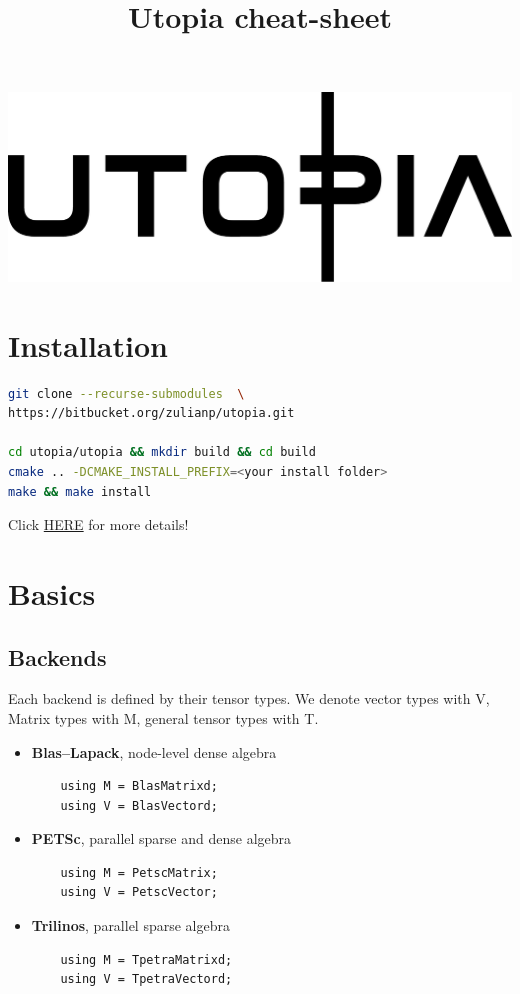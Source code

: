 \documentclass[a4paper,landscape,columns=3]{cheatsheet} %
\title{Utopia cheat-sheet}
\begin{document}
\href{https://bitbucket.org/zulianp/utopia}{\includegraphics[width=0.5\linewidth]{../../utopia_logo.pdf}}
\section{Installation}\footnotesize

\begin{lstlisting}[language=bash]
git clone --recurse-submodules  \
https://bitbucket.org/zulianp/utopia.git

cd utopia/utopia && mkdir build && cd build
cmake .. -DCMAKE_INSTALL_PREFIX=<your install folder>
make && make install
\end{lstlisting}

Click  \href{https://bitbucket.org/zulianp/utopia/wiki/Getting%20started}{HERE} for more details!

\section{Basics}
\subsection{Backends}\footnotesize
Each backend is defined by their tensor types. We denote vector types with V, Matrix types with M, general tensor types with T.
\begin{itemize}
    \item
    \textbf{Blas--Lapack}, node-level dense algebra
    \begin{lstlisting}
    using M = BlasMatrixd;
    using V = BlasVectord;
    \end{lstlisting}
    \item
    \textbf{PETSc}, parallel sparse and dense algebra
    \begin{lstlisting}
    using M = PetscMatrix;
    using V = PetscVector;
    \end{lstlisting}
    \item
    \textbf{Trilinos}, parallel sparse algebra
    \begin{lstlisting}
    using M = TpetraMatrixd;
    using V = TpetraVectord;
    \end{lstlisting}
\end{itemize}
\end{document}
